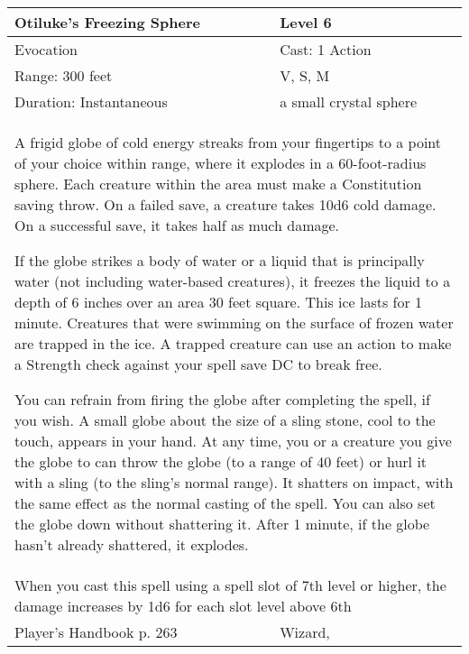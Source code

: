\documentclass[11pt]{report}
\begin{document}
\begin{table}[H]
	\begin{tabular}{||p{6cm}|p{6cm}||}
		\hline\hline
		\bf{Otiluke’s Freezing Sphere} & Level 6\\ \hline
		Evocation & Cast: 1 Action\\ \hline
		Range: 300 feet & V, S, M\\ \hline
		Duration: Instantaneous & a small crystal sphere\\ \hline
		\multicolumn{2}{||p{12cm}||}{A frigid globe of cold energy streaks from your fingertips to a point of your choice within range, where it explodes in a 60-foot-radius sphere.
Each creature within the area must make a Constitution saving throw. On a failed save, a creature takes 10d6 cold damage. On a successful save, it takes half as much damage.

If the globe strikes a body of water or a liquid that is principally water (not including water-based creatures), it freezes the liquid to a depth of 6 inches over an area 30 feet square. This ice lasts for 1 minute. Creatures that were swimming on the surface of frozen water are trapped in the ice. A trapped creature can use an action to make a Strength check against your spell save DC to break free.

You can refrain from firing the globe after completing the spell, if you wish. A small globe about the size of a sling stone, cool to the touch, appears in your hand. At any time, you or a creature you give the globe to can throw the globe (to a range of 40 feet) or hurl it with a sling (to the sling’s normal range). It shatters on impact, with the same effect as the normal casting of the spell. You can also set the globe down without shattering it. After 1 minute, if the globe hasn’t already shattered, it explodes.}\\ \hline
		\multicolumn{2}{||p{12cm}||}{When you cast this spell using a spell slot of 7th level or higher, the damage increases by 1d6 for each slot level above 6th}\\ \hline
Player's Handbook p. 263 & Wizard, \\ \hline\hline
	\end{tabular}
\end{table}
\end{document}
